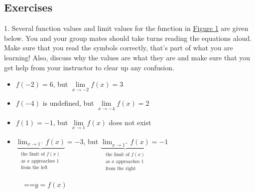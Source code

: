 \documentclass[10pt,oneside,]{book}
\theoremstyle{plain}
\theoremstyle{definition}
\numberwithin{equation}{section}
\newcommand{\fe}[2]{#1\mathopen{}\left(#2\right)\mathclose{}}
\begin{document}
\subsection[Exercises]{Exercises}\label{exercises-5}
\begin{exerciselist}
\item[1.]\hypertarget{exercise-46}{\null}Several function values and limit values for the function in \hyperref[figure-first-limit]{Figure \ref{figure-first-limit}} are given below. You and your group mates should take turns reading the equations aloud. Make sure that you read the symbols correctly, that's part of what you are learning! Also, discuss why the values are what they are and make sure that you get help from your instructor to clear up any confusion.%
\begin{itemize}[label=\textbullet]
\item{}\(\fe{f}{-2}=6\), but \(\lim\limits_{x\to-2}\fe{f}{x}=3\)\item{}\(\fe{f}{-4}\) is undefined, but \(\lim\limits_{x\to-4}\fe{f}{x}=2\)\item{}\(\fe{f}{1}=-1\), but \(\lim\limits_{x\to1}\fe{f}{x}\) does not exist\item{}\(\underbrace{\lim_{x\to1^{-}}\fe{f}{x}}_{\begin{array}{c}\text{the limit of }\fe{f}{x}\\\text{as }x\text{ approaches }1\\\text{from the left}\end{array}}=-3\), but \(\underbrace{\lim_{x\to1^{+}}\fe{f}{x}}_{\begin{array}{c}\text{the limit of }\fe{f}{x}\\\text{as }x\text{ approaches }1\\\text{from the right}\end{array}}=-1\)\end{itemize}
\begin{figure}
\centering
{
}
\caption{\binoppenalty=\maxdimen \relpenalty=\maxdimen \(y=\fe{f}{x}\)\label{figure-first-limit}}
\end{figure}
\par\smallskip
\end{exerciselist}
\end{document}
